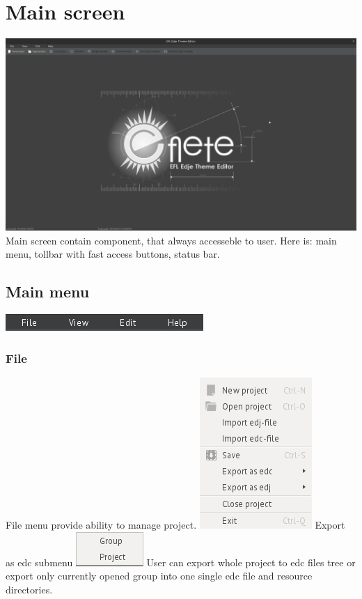 \documentclass[titlepage,oneside,11pt]{book}
\begin{document}
\section{Main screen}
\includegraphics[scale=0.2]{images/main_screen.png}
Main screen contain component, that always accesseble to user. Here is: main menu, tollbar with fast access buttons, status bar.
\subsection{Main menu}
\includegraphics{images/main_menu.png}
\subsubsection{File}
File menu provide ability to manage project. 
\includegraphics{images/file_menu.png}
Export as edc submenu
\includegraphics{images/file_export_as_edc_submenu.png}
User can export whole project to edc files tree or export only currently opened group into one single edc file and resource directories.
\end{document}
